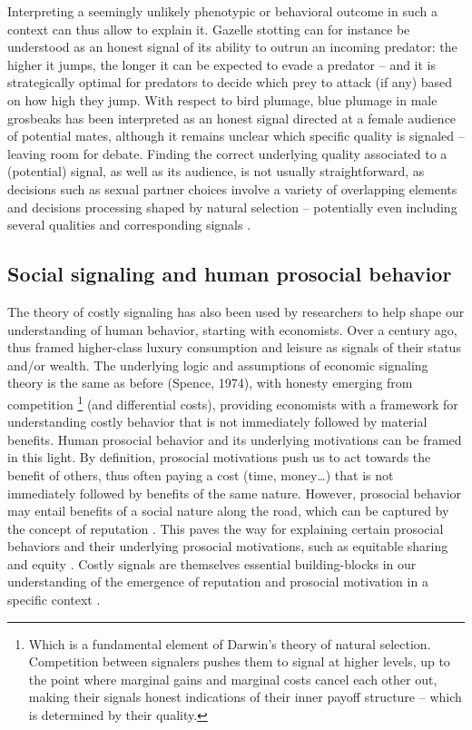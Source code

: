 \documentclass[a4paper,12pt]{report}
\begin{document}
Interpreting a seemingly unlikely phenotypic or behavioral outcome in such a context
can thus allow to explain it. Gazelle stotting can for instance be understood
as an honest signal of its ability to outrun an incoming predator:
the higher it jumps, the longer it can be expected to evade a predator –
and it is strategically optimal for predators to decide which prey to attack
(if any) based on how high they jump. With respect to bird plumage, blue plumage
in male grosbeaks \cite{keyser_structurally_2000} has been interpreted as an honest signal directed
at a female audience of potential mates, although it remains unclear which specific quality
is signaled – leaving room for debate. Finding the correct underlying quality associated
to a (potential) signal, as well as its audience, is not usually straightforward,
as decisions such as sexual partner choices involve a variety of overlapping elements
and decisions processing shaped by natural selection – potentially even including
several qualities and corresponding signals \cite{doucet_multiple_2003}.


\subsection{Social signaling and human prosocial behavior}
\label{s:sgl_h}
The theory of costly signaling has also been used by researchers to help shape our
understanding of human behavior, starting with economists. Over a century ago, 
\cite{veblen_theory_1973}
thus framed higher-class luxury consumption and leisure as signals of their status 
and/or wealth. The underlying logic and assumptions of economic signaling theory is 
the same as before (Spence, 1974), with honesty emerging from competition
\footnote{Which is a fundamental element of Darwin’s \citeyear{darwin_origin_2002} theory of natural selection.
Competition between signalers pushes them to signal at higher levels, up to the point where
marginal gains and marginal costs cancel each other out, making their 
signals honest indications of their inner payoff structure – which is determined by their
quality.}
(and differential costs), providing economists with a framework for understanding costly behavior that is not immediately followed by material benefits.
Human prosocial behavior and its underlying motivations can be framed in this light. 
By definition, prosocial motivations push us to act towards the benefit of others, 
thus often paying a cost (time, money…) that is not immediately followed by benefits 
of the same nature. However, prosocial behavior may entail benefits of a social 
nature along the road, which can be captured by the concept of reputation 
\cite{sperber_moral_2012}. This paves the way for explaining certain prosocial 
behaviors and their underlying prosocial motivations, such as equitable sharing 
and equity \cite{debove_evolutionary_2017}.  Costly signals are themselves 
essential building-blocks in our understanding of the emergence of reputation 
and prosocial motivation in a specific context 
\cite{geoffroy_why_2019}.
\end{document}
